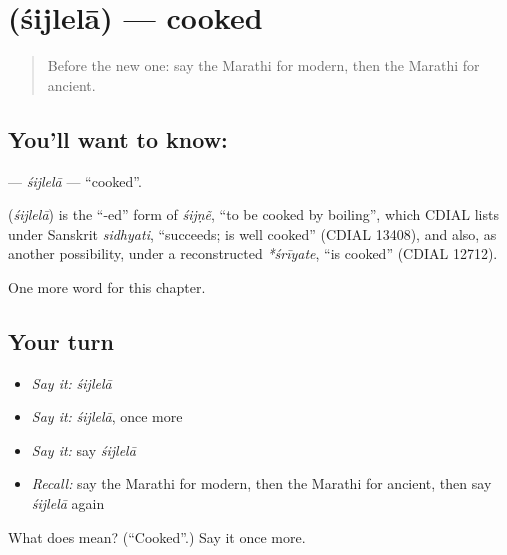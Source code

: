 \section[\texorpdfstring{\mr{शिजलेला} (śijlelā)}{शिजलेला (śijlelā)}]{ (śijlelā) — cooked}

\label{lesson:MR-C205-sijlela}



\begin{quote}
Before the new one: say the Marathi for modern, then the Marathi for ancient.
\end{quote}

\subsection*{You'll want to know: }
\textbf{} — \emph{śijlelā} — \textquotedblleft{}cooked\textquotedblright{}.

\begin{cousinweb}
\textbf{} (\emph{śijlelā}) is the \textquotedblleft{}-ed\textquotedblright{} form of \emph{śijṇẽ}, \textquotedblleft{}to be cooked by boiling\textquotedblright{}, which CDIAL lists under Sanskrit \emph{sidhyati}, \textquotedblleft{}succeeds; is well cooked\textquotedblright{} (CDIAL 13408), and also, as another possibility, under a reconstructed \emph{*śrīyate}, \textquotedblleft{}is cooked\textquotedblright{} (CDIAL 12712).
\end{cousinweb}

\begin{grammarlens}[title={What you've built}]
One more word for this chapter.
\end{grammarlens}

\subsection*{Your turn}
\begin{itemize}
\raggedright
  \item \emph{Say it:} \emph{śijlelā}
  \item \emph{Say it:} \emph{śijlelā}, once more
  \item \emph{Say it:} say \emph{śijlelā}
  \item \emph{Recall:} say the Marathi for modern, then the Marathi for ancient, then say \emph{śijlelā} again
\end{itemize}

\begin{tcolorbox}[breakable,colback=teal!4,colframe=teal!35!black,title={Before you move on}]
What does  mean? (\textquotedblleft{}Cooked\textquotedblright{}.) Say it once more.
\end{tcolorbox}
